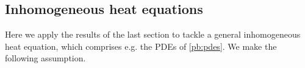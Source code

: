 \documentclass[english,a4paper,10pt,oneside]{scrbook}	%
\theoremstyle{break}
\theoremstyle{remark}
\newcommand{\ds}{\displaystyle}
\newcommand{\norm}[1]{\left\lVert#1\right\rVert}
\newcommand{\HN}[1]{\norm{#1}_{H}}
\newcommand{\VN}[1]{\norm{#1}_{V}}
\newcommand{\VSN}[1]{\norm{#1}_{V^*}}
\newcommand{\emb}{\hookrightarrow}
\begin{document}
\begin{appendices}
%
%
%
%
%
%
%
%
%
%
%
%
%

\section{Inhomogeneous heat equations}
\label{sec:pdes}
Here we apply the results of the last section to tackle a general inhomogeneous heat equation, which comprises e.g. the PDEs of \cref{pb:pdes}. We make the following assumption.



\end{appendices}
\end{document}
